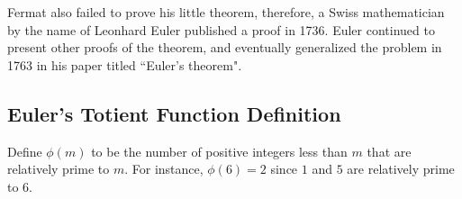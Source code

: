 Fermat also failed to prove his little theorem, therefore, a Swiss mathematician by the name of Leonhard Euler published a proof in 1736. Euler continued to present other proofs of the theorem, and eventually generalized the problem in 1763 in his paper titled ``Euler's theorem".

\subsection{Euler's Totient Function Definition}
\begin{defi} Define $\phi(m)$ to be the number of positive integers less than $m$ that are relatively prime to $m$. For instance, $\phi(6)=2$ since $1$ and $5$ are relatively prime to $6$. \end{defi}


\clearpage


